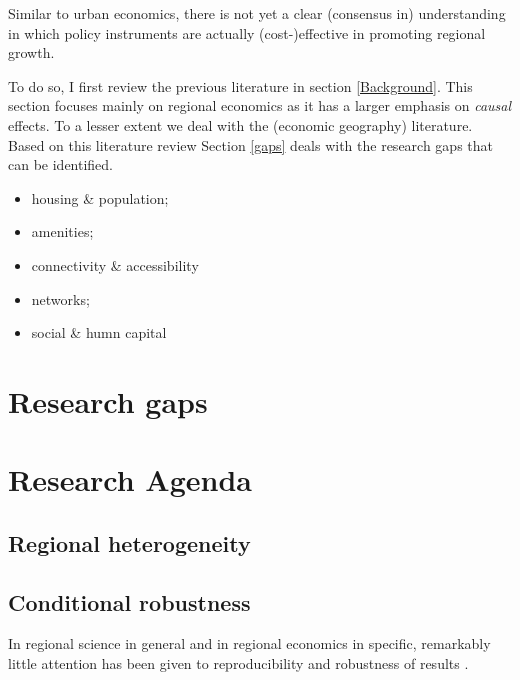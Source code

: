 \documentclass[fleqn,10pt]{SelfArx} %
\begin{document}
Similar to urban economics, there is not yet a clear (consensus in) understanding in which policy instruments are actually (cost-)effective in promoting regional growth. 

To do so, I first review the previous literature in section \ref{Background}. This section focuses mainly on regional economics as it has a larger emphasis on \textit{causal} effects. To a lesser extent we deal with the (economic geography) literature. Based on this literature review Section \ref{gaps} deals with the research gaps that can be identified.


\begin{itemize}
	\item housing \& population; 
	\item amenities;
	\item connectivity \& accessibility
	\item networks;
	\item social \& humn capital
\end{itemize}


\section{Research gaps\label{gaps}}


\section{Research Agenda\label{agenda}}


\subsection{Regional heterogeneity}

\citep{Thissen2016, Graaff2012, DeGraaff2012}

\subsection{Conditional robustness}

In regional science in general and in regional economics in specific, remarkably little attention has been given to reproducibility and robustness of results \citep[with some exceptions as, amongst some others, by][]{Rey:2014cl,arribas2015woow, Arribas2016}.
\end{document}
